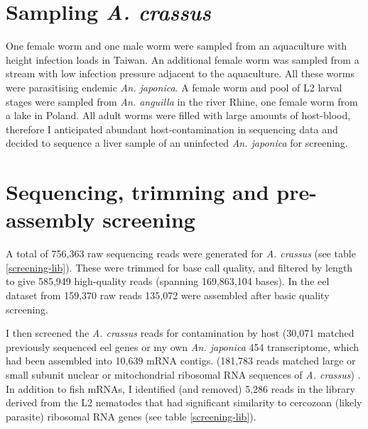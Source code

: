 \section{Sampling \textit{A. crassus}}

One female worm and one male worm were sampled from an aquaculture
with height infection loads in Taiwan. An additional female worm was
sampled from a stream with low infection pressure adjacent to the
aquaculture. All these worms were parasitising endemic
\textit{An. japonica}. A female worm and pool of L2 larval stages were
sampled from \textit{An. anguilla} in the river Rhine, one female worm
from a lake in Poland. All adult worms were filled with large amounts
of host-blood, therefore I anticipated abundant host-contamination in
sequencing data and decided to sequence a liver sample of an
uninfected \textit{An. japonica} for screening.

\section{Sequencing, trimming and pre-assembly screening}

A total of 756,363 raw sequencing reads were generated for
\textit{A. crassus} (see table \ref{screening-lib}). These were
trimmed for base call quality, and filtered by length to give 585,949
high-quality reads (spanning 169,863,104 bases). In the eel dataset from
159,370 raw reads 135,072 were assembled after basic quality screening.

I then screened the \textit{A. crassus} reads for contamination by
host (30,071 matched previously sequenced eel genes or my own
\textit{An. japonica} 454 transcriptome, which had been assembled into
10,639 mRNA contigs. (181,783 reads matched large or small subunit
nuclear or mitochondrial ribosomal RNA sequences of
\textit{A. crassus}) . In addition to fish mRNAs, I identified (and
removed) 5,286 reads in the library derived from the L2 nematodes that
had significant similarity to cercozoan (likely parasite) ribosomal
RNA genes (see table \ref{screening-lib}).


